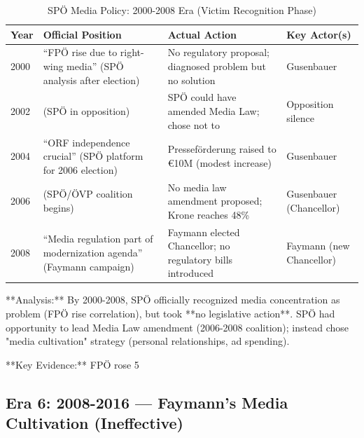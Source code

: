 \begin{table}[h]
\centering
\small
\caption{SPÖ Media Policy: 2000-2008 Era (Victim Recognition Phase)}
\label{tab:bh-media-policy-2000-2008}
\begin{tabular}{|p{2.5cm}|p{3cm}|p{3cm}|p{4cm}|}
\hline
\textbf{Year} & \textbf{Official Position} & \textbf{Actual Action} & \textbf{Key Actor(s)} \\
\hline
2000 & ``FPÖ rise due to right-wing media'' (SPÖ analysis after election) & No regulatory proposal; diagnosed problem but no solution & Gusenbauer \\
\hline
2002 & (SPÖ in opposition) & SPÖ could have amended Media Law; chose not to & Opposition silence \\
\hline
2004 & ``ORF independence crucial'' (SPÖ platform for 2006 election) & Presseförderung raised to €10M (modest increase) & Gusenbauer \\
\hline
2006 & (SPÖ/ÖVP coalition begins) & No media law amendment proposed; Krone reaches 48\% & Gusenbauer (Chancellor) \\
\hline
2008 & ``Media regulation part of modernization agenda'' (Faymann campaign) & Faymann elected Chancellor; no regulatory bills introduced & Faymann (new Chancellor) \\
\hline
\end{tabular}
\end{table}

**Analysis:** By 2000-2008, SPÖ officially recognized media concentration as problem (FPÖ rise correlation), but took **no legislative action**.
SPÖ had opportunity to lead Media Law amendment (2006-2008 coalition); instead chose "media cultivation" strategy (personal relationships, ad spending).

**Key Evidence:** FPÖ rose 5%

\subsection*{Era 6: 2008-2016 --- Faymann's Media Cultivation (Ineffective)}

